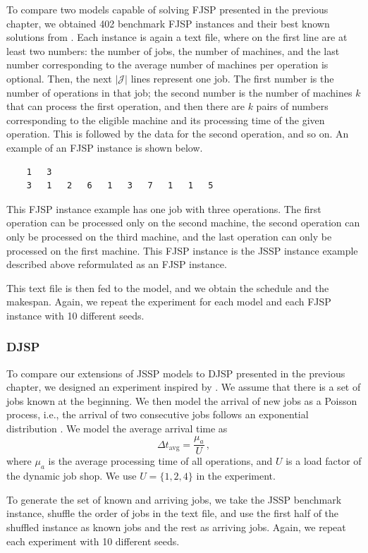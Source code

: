 To compare two models capable of solving FJSP presented in the previous chapter, we obtained 402 benchmark FJSP instances and their best known solutions from \cite{fjsp_benchmarks}. Each instance is again a text file, where on the first line are at least two numbers: the number of jobs, the number of machines, and the last number corresponding to the average number of machines per operation is optional. Then, the next $|\mathcal{J}|$ lines represent one job. The first number is the number of operations in that job; the second number is the number of machines $k$ that can process the first operation, and then there are $k$ pairs of numbers corresponding to the eligible machine and its processing time of the given operation. This is followed by the data for the second operation, and so on. An example of an FJSP instance is shown below.
\begin{verbatim}
    1   3
    3   1   2   6   1   3   7   1   1   5   
\end{verbatim}
This FJSP instance example has one job with three operations. The first operation can be processed only on the second machine, the second operation can only be processed on the third machine, and the last operation can only be processed on the first machine. This FJSP instance is the JSSP instance example described above reformulated as an FJSP instance.
\par 
This text file is then fed to the model, and we obtain the schedule and the makespan. Again, we repeat the experiment for each model and each FJSP instance with 10 different seeds.

\subsubsection*{DJSP}
To compare our extensions of JSSP models to DJSP presented in the previous chapter, we designed an experiment inspired by \cite{djsp_experiment_design}. We assume that there is a set of jobs known at the beginning. We then model the arrival of new jobs as a Poisson process, i.e., the arrival of two consecutive jobs follows an exponential distribution \cite{djsp_experiment_design}. We model the average arrival time as 
\begin{equation}
    \Delta t_\text{avg} = \frac{\mu_a}{U} \, ,
\end{equation}
where $\mu_a$ is the average processing time of all operations, and $U$ is a load factor of the dynamic job shop. We use $U = \{1,2,4 \}$ in the experiment. 
\par
To generate the set of known and arriving jobs, we take the JSSP benchmark instance, shuffle the order of jobs in the text file, and use the first half of the shuffled instance as known jobs and the rest as arriving jobs. Again, we repeat each experiment with 10 different seeds.

